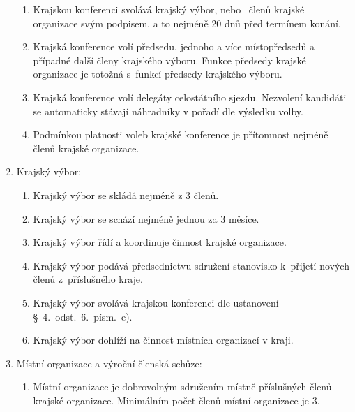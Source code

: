 \documentclass[a4paper]{article}
\begin{document}
\begin{enumerate}
\begin{enumerate}
        \item Krajskou konferenci svolává krajský výbor, nebo
            ~členů krajské organizace svým podpisem, a to
            nejméně 20 dnů před termínem konání.

        \item Krajská konference volí předsedu, jednoho a více místopředsedů a případné další členy krajského výboru.
            Funkce předsedy krajské organizace je totožná s~funkcí předsedy
            krajského výboru.

        \item Krajská konference volí delegáty celostátního sjezdu. Nezvolení
            kandidáti se automaticky stávají náhradníky v pořadí dle výsledku
            volby.

        \item Podmínkou platnosti voleb krajské konference je přítomnost
            nejméně  členů krajské organizace.
        \end{enumerate}

    \item Krajský výbor:
        \begin{enumerate}
        \item Krajský výbor se skládá nejméně z 3 členů.

        \item Krajský výbor se schází nejméně jednou za 3 měsíce.

        \item Krajský výbor řídí a koordinuje činnost krajské organizace.

        \item Krajský výbor podává předsednictvu sdružení stanovisko k~přijetí
            nových členů z~příslušného kraje.

        \item Krajský výbor svolává krajskou konferenci dle ustanovení
            \S~4.~odst.~6.~písm.~e).

        \item Krajský výbor dohlíží na činnost místních organizací v kraji.
        \end{enumerate}

    \item Místní organizace a výroční členská schůze:
        \begin{enumerate}
        \item Místní organizace je dobrovolným sdružením místně příslušných
            členů krajské organizace. Minimálním počet členů místní organizace
            je 3.


\end{enumerate}
\end{enumerate}
\end{document}
